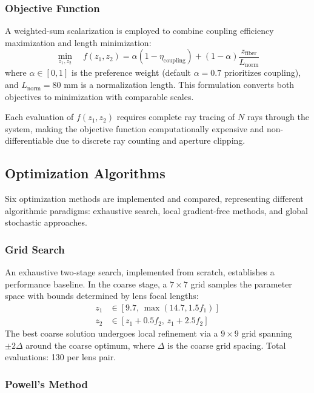 \subsubsection{Objective Function}

A weighted-sum scalarization is employed to combine coupling efficiency maximization and length minimization:
\begin{equation}
\min_{z_1,z_2} \quad f(z_1, z_2) = \alpha(1 - \eta_{\text{coupling}}) + (1-\alpha)\frac{z_{\text{fiber}}}{L_{\text{norm}}}
\end{equation}
where $\alpha \in [0,1]$ is the preference weight (default $\alpha = 0.7$ prioritizes coupling), and $L_{\text{norm}} = 80$ mm is a normalization length. This formulation converts both objectives to minimization with comparable scales.

Each evaluation of $f(z_1, z_2)$ requires complete ray tracing of $N$ rays through the system, making the objective function computationally expensive and non-differentiable due to discrete ray counting and aperture clipping.

\subsection{Optimization Algorithms}

Six optimization methods are implemented and compared, representing different algorithmic paradigms: exhaustive search, local gradient-free methods, and global stochastic approaches.

\subsubsection{Grid Search}

An exhaustive two-stage search, implemented from scratch, establishes a performance baseline. In the coarse stage, a $7 \times 7$ grid samples the parameter space with bounds determined by lens focal lengths:
\begin{align}
z_1 &\in [9.7, \, \max(14.7, 1.5f_1)] \\
z_2 &\in [z_1 + 0.5f_2, \, z_1 + 2.5f_2]
\end{align}
The best coarse solution undergoes local refinement via a $9 \times 9$ grid spanning $\pm 2\Delta$ around the coarse optimum, where $\Delta$ is the coarse grid spacing. Total evaluations: 130 per lens pair.

\subsubsection{Powell's Method}

